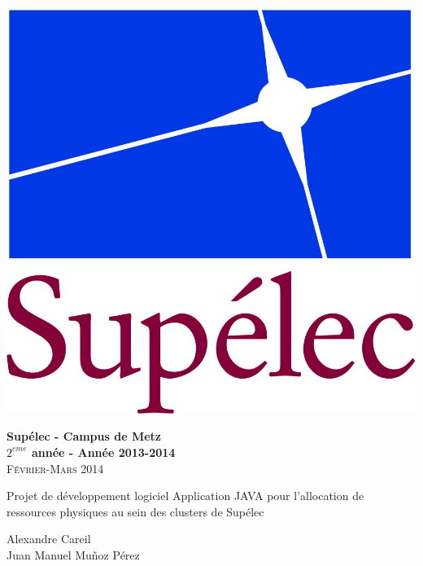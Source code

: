 \begin{minipage}{1\textwidth}
  \centering 

  \begin{flushleft}
    \includegraphics[scale=0.3]{LogoSup.jpg}
    \newline

    \textbf{Supélec - Campus de Metz\\
      $2^{eme}$ année - Année 2013-2014}\\
    \textsc{Février-Mars 2014}
  \end{flushleft}
  
  \vskip 5cm
  {\LARGE\textsc Projet de développement logiciel}
  \vskip 0.5cm
  {\LARGE\textsc Application JAVA pour l'allocation de ressources physiques au sein des clusters de Supélec}
  \vskip 5cm

  \Large{Alexandre Careil \\
    Juan Manuel Mu\~noz Pérez}
\end{minipage}

